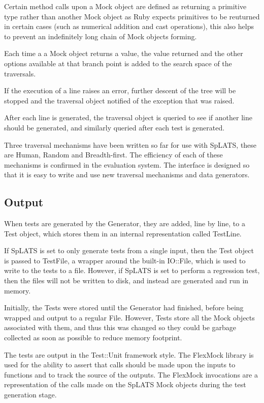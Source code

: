     Certain method calls upon a Mock object are defined as returning a primitive
type rather than another Mock object as Ruby expects primitives to be reuturned
in certain cases (such as numerical addition and cast operations), this also
helps to prevent an indefinitely long chain of Mock objects forming.

    Each time a a Mock object returns a value, the value returned and the other
options available at that branch point is added to the search space of the
traversals.

    If the execution of a line raises an error, further descent of the tree will
be stopped and the traversal object notified of the exception that was raised.

    After each line is generated, the traversal object is queried to see if
another line should be generated, and similarly queried after each test is
generated.

    Three traversal mechanisms have been written so far for use with SpLATS, these
are Human, Random and Breadth-first. The efficiency of each of these mechanisms
is confirmed in the evaluation system. The interface is designed so that it is
easy to write and use new traversal mechanisms and data generators.

  \subsection{Output}
    When tests are generated by the Generator, they are added, line by line, to a Test object, which stores them in an internal representation called TestLine.
    
    If SpLATS is set to only generate tests from a single input, then the Test object is passed to TestFile, a wrapper around the built-in IO::File, which is used to write to the tests to a file.
    However, if SpLATS is set to perform a regression test, then the files will not be written to disk, and instead are generated and run in memory. 
    
    Initially, the Tests were stored until the Generator had finished, before being wrapped and output to a regular File.
    However, Tests store all the Mock objects associated with them, and thus this was changed so they could be garbage collected as soon as possible to reduce memory footprint.
    
     The tests are output in the Test::Unit framework style. The FlexMock library
is used for the ability to assert that calls should be made upon the inputs to
functions and to track the source of the outputs. The FlexMock invocations are a
representation of the calls made on the SpLATS Mock objects during the test
generation stage.
